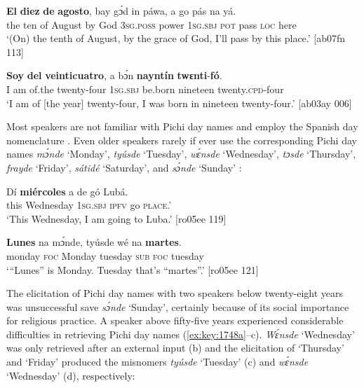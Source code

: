 \ea%
    \label{ex:key:1744}
    \gll \textbf{El}  \textbf{diez}  \textbf{de}  \textbf{agosto},  bay  gɔ́d  in    páwa,  a    go  pás  na  yá.\\
the  ten  of  August  by  God  \textsc{3sg.poss}  power  \textsc{1sg.sbj}  \textsc{pot}  pass  \textsc{loc}  here\\

\glt ‘(On) the tenth of August, by the grace of God, I’ll pass by this place.’ [ab07fn 113]
\z


\ea%
    \label{ex:key:1745}
    \gll \textbf{Soy}    \textbf{del}    \textbf{veinticuatro},  a    bɔ́n    \textbf{nayntín}  \textbf{twɛnti}{}-\textbf{fó}.\\
{I am}    of.the  twenty-four  \textsc{1sg.sbj}  be.born  nineteen  twenty.\textsc{cpd}{}-four\\

\glt ‘I am of [the year] twenty-four, I was born in nineteen twenty-four.’ [ab03ay 006]
\z

Most speakers are not familiar with Pichi day names and employ the Spanish day nomenclature . Even older speakers rarely if ever use the corresponding Pichi day names \textit{mɔ́nde} ‘Monday’, \textit{tyúsde} ‘Tuesday’, \textit{wɛ́nsde} ‘Wednesday’, \textit{tɔsde} ‘Thursday’, \textit{frayde} ‘Friday’, \textit{sátidé} ‘Saturday’, and \textit{sɔ́nde} ‘Sunday’ :


\ea%
    \label{ex:key:1746}
    \gll Dí  \textbf{miércoles}  a    de  gó  Lubá.\\
this  Wednesday  \textsc{1sg.sbj}  \textsc{ipfv}  go  \textsc{place}.’\\

\glt ‘This Wednesday, I am going to Luba.’ [ro05ee 119]
\z


\ea%
    \label{ex:key:1747}
    \gll \textbf{Lunes}  na  mɔ́nde,  tyúsde  wé  na  \textbf{martes}.\\
monday  \textsc{foc}  Monday  tuesday  \textsc{sub}  \textsc{foc}  tuesday\\

\glt ‘“Lunes” is Monday. Tuesday that’s “martes”.’ [ro05ee 121]
\z

The elicitation of Pichi day names with two speakers below twenty-eight years was unsuccessful save \textit{sɔ́nde} ‘Sunday’, certainly because of its social importance for religious practice. A speaker above fifty-five years experienced considerable difficulties in retrieving Pichi day names (\ref{ex:key:1748a}–c). \textit{Wɛ́nsde} ‘Wednesday’ was only retrieved after an external input (b) and the elicitation of ‘Thursday’ and ‘Friday’ produced the misnomers \textit{tyúsde} ‘Tuesday’ (c) and \textit{wɛ́nsde} ‘Wednesday’ (d), respectively:


